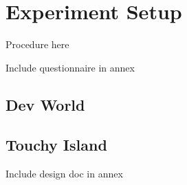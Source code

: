 \section{Experiment Setup}
\label{sec:experimentSetup}

Procedure here

Include questionnaire in annex

\subsection{Dev World}
\label{subsec:devWorld}

\subsection{Touchy Island}
\label{subsec:touchyIsland}

Include design doc in annex